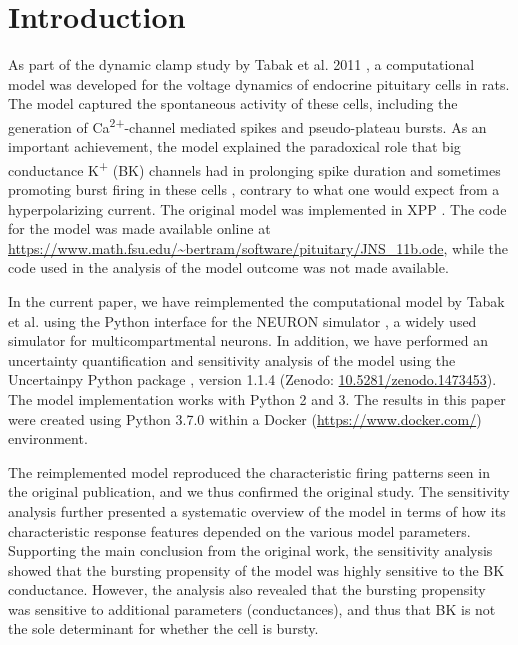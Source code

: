 \documentclass[10pt,a4paper,onecolumn]{article}
\begin{document}
\section{Introduction}\label{introduction}

As part of the dynamic clamp study by Tabak et al. 2011
\autocite{tabak2011}, a computational model was developed for the
voltage dynamics of endocrine pituitary cells in rats. The model
captured the spontaneous activity of these cells, including the
generation of Ca\textsuperscript{2+}-channel mediated spikes and
pseudo-plateau bursts. As an important achievement, the model explained
the paradoxical role that big conductance K\textsuperscript{+} (BK)
channels had in prolonging spike duration and sometimes promoting burst
firing in these cells \autocite{vangoor2001}, contrary to what one would
expect from a hyperpolarizing current. The original model was
implemented in XPP \autocite{ermentrout2002}. The code for the model was
made available online at
\url{https://www.math.fsu.edu/~bertram/software/pituitary/JNS_11b.ode},
while the code used in the analysis of the model outcome was not made
available.

In the current paper, we have reimplemented the computational model by
Tabak et al. \autocite{tabak2011} using the Python interface for the
NEURON simulator \autocite{hines1997}, a widely used simulator for
multicompartmental neurons. In addition, we have performed an
uncertainty quantification and sensitivity analysis of the model using
the Uncertainpy Python package \autocite{uncertainpy}, version 1.1.4
(Zenodo:
\href{http://doi.org/10.5281/zenodo.1473453}{10.5281/zenodo.1473453}).
The model implementation works with Python 2 and 3. The results in this
paper were created using Python 3.7.0 within a Docker
(\url{https://www.docker.com/}) environment.

The reimplemented model reproduced the characteristic firing patterns
seen in the original publication, and we thus confirmed the original
study. The sensitivity analysis further presented a systematic overview
of the model in terms of how its characteristic response features
depended on the various model parameters. Supporting the main conclusion
from the original work, the sensitivity analysis showed that the
bursting propensity of the model was highly sensitive to the BK
conductance. However, the analysis also revealed that the bursting
propensity was sensitive to additional parameters (conductances), and
thus that BK is not the sole determinant for whether the cell is bursty.
\end{document}
